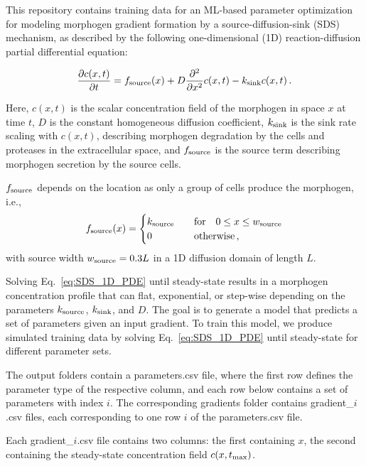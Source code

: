 \documentclass[11pt]{article}
\begin{document}
This repository contains training data for an ML-based parameter optimization for modeling morphogen gradient formation by a source-diffusion-sink (SDS) mechanism, as described by the following one-dimensional (1D) reaction-diffusion partial differential equation:

\begin{equation}\label{eq:SDS_1D_PDE}
	\frac{\partial c(x,t)}{\partial t} = f_{\rm{source}}(x) + D\frac{\partial^2 }{\partial x^2}c(x,t) - k_{\rm{sink}}c(x,t)\,.
\end{equation}

Here, $c(x,t)$ is the scalar concentration field of the morphogen in space $x$ at time $t$, $D$ is the constant homogeneous diffusion coefficient, $k_{\rm{sink}}$ is the sink rate scaling with $c(x,t)$, describing morphogen degradation by the cells and proteases in the extracellular space, and $f_{\rm{source}}$ is the source term describing morphogen secretion by the source cells. 

$f_{\rm{source}}$ depends on the location as only a group of cells produce the morphogen, i.e.,
\begin{equation}\label{eq:source}
	f_{\rm{source}}(x) =
        \begin{cases}
        k_{\rm{source}} \quad & \text{for} \quad  0 \le x \le w_{\rm{source}}  \\
        0 & \rm{otherwise}\, ,
    \end{cases}  
\end{equation}
%
with source width $w_{\rm{source}} = 0.3 L$ in a 1D diffusion domain of length $L$. 

Solving Eq.~\eqref{eq:SDS_1D_PDE} until steady-state results in a morphogen concentration profile that can flat, exponential, or step-wise depending on the parameters $k_{\rm{source}}$, $k_{\rm{sink}}$, and $D$. The goal is to generate a model that predicts a set of parameters given an input gradient. To train this model, we produce simulated training data by solving Eq.~\eqref{eq:SDS_1D_PDE} until steady-state for different parameter sets.

The output folders contain a parameters.csv file, where the first row defines the parameter type of the respective column, and each row below contains a set of parameters with index $i$. The corresponding gradients folder contains gradient\_$i$.csv files, each corresponding to one row $i$ of the parameters.csv file. 

Each gradient\_$i$.csv file contains two columns: the first containing $x$, the second containing the steady-state concentration field $c(x, t_{\rm{max}})$.
\end{document}
